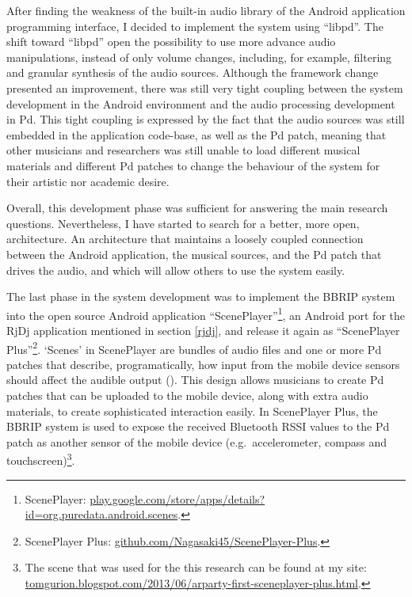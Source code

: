 \documentclass[a4paper,11pt]{article}
\begin{document}
{After finding the weakness of the built-in audio library of the Android application programming interface, I decided to implement the system using ``libpd''.
The shift toward ``libpd'' open the possibility to use more advance audio manipulations, instead of only volume changes, including, for example, filtering and granular synthesis of the audio sources.
Although the framework change presented an improvement, there was still very tight coupling between the system development in the Android environment and the audio processing development in Pd.
This tight coupling is expressed by the fact that the audio sources was still embedded in the application code-base, as well as the Pd patch, meaning that other musicians and researchers was still unable to load different musical materials and different Pd patches to change the behaviour of the system for their artistic nor academic desire.

Overall, this development phase was sufficient for answering the main research questions.
Nevertheless, I have started to search for a better, more open, architecture.
An architecture that maintains a loosely coupled connection between the Android application, the musical sources, and the Pd patch that drives the audio, and which will allow others to use the system easily.

The last phase in the system development was to implement the BBRIP system into the open source Android application ``ScenePlayer''\footnote{ScenePlayer: \href{http://play.google.com/store/apps/details?id=org.puredata.android.scenes}{play.google.com/store/apps/details?id=org.puredata.android.scenes}.}, an Android port for the RjDj application mentioned in section \ref{rjdj}, and release it again as ``ScenePlayer Plus''\footnote{ScenePlayer Plus: \href{https://github.com/Nagasaki45/ScenePlayer-Plus}{github.com/Nagasaki45/ScenePlayer-Plus}.}.
`Scenes' in ScenePlayer are bundles of audio files and one or more Pd patches that describe, programatically, how input from the mobile device sensors should affect the audible output (\cite[p. 29]{brinkmann12}).
This design allows musicians to create Pd patches that can be uploaded to the mobile device, along with extra audio materials, to create sophisticated interaction easily.
In ScenePlayer Plus, the BBRIP system is used to expose the received Bluetooth RSSI values to the Pd patch as another sensor of the mobile device (e.g.\ accelerometer, compass and touchscreen)\footnote{The scene that was used for the this research can be found at my site: \href{http://tomgurion.blogspot.com/2013/06/arparty-first-sceneplayer-plus.html}{tomgurion.blogspot.com/2013/06/arparty-first-sceneplayer-plus.html}.}.

}
\end{document}

